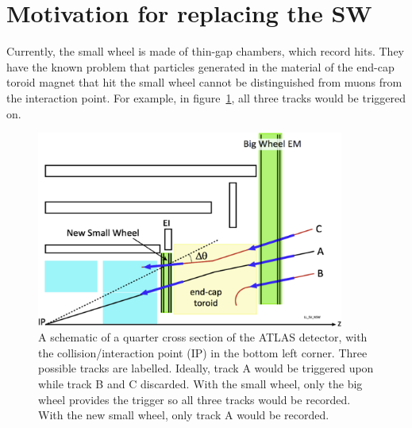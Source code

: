 
\section{Motivation for replacing the SW}
Currently, the small wheel is made of thin-gap chambers, which record hits. They have the known problem that particles generated in the material of the end-cap toroid magnet that hit the small wheel cannot be distinguished from muons from the interaction point. For example, in figure~\ref{fig:nsw_track_triggering}, all three tracks would be triggered on.

\begin{figure}
    \centering
    \includegraphics[width = 0.9\textwidth]{figures/perez-codina_NSW_tracks.jpg}
    \caption{A schematic of a quarter cross section of the ATLAS detector, with the collision/interaction point (IP) in the bottom left corner. Three possible tracks are labelled. Ideally, track A would be triggered upon while track B and C discarded. With the small wheel, only the big wheel provides the trigger so all three tracks would be recorded. With the new small wheel, only track A would be recorded.}
    \label{fig:nsw_track_triggering}
\end{figure}



